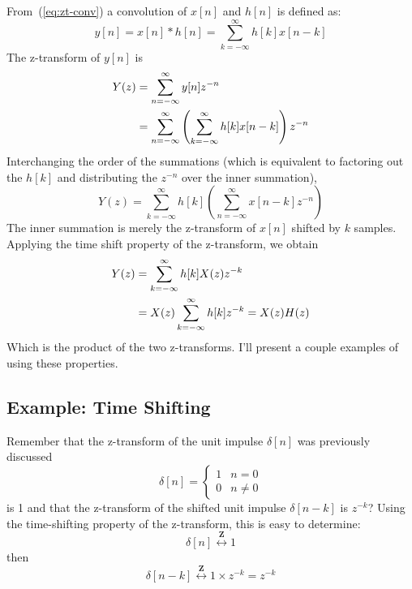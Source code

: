 From~(\ref{eq:zt-conv}) a convolution of $x[n]$ and $h[n]$ is defined as:
\begin{equation}
y[n] = x[n] \ast h[n] = \sum_{k=-\infty}^{\infty} h[k] x[n-k]
\end{equation}
The z-transform of $y[n]$ is 
\begin{align}
Y(z) &= \sum_{n=-\infty}^{\infty} y[n]z^{-n} \notag\\
     &= \sum_{n=-\infty}^{\infty}
     \left( \sum_{k=-\infty}^{\infty} h[k] x[n-k] \right)z^{-n}
\end{align}
Interchanging the order of the summations (which is equivalent to
factoring out the $h[k]$ and distributing the $z^{-n}$ over the inner
summation),
\begin{equation}
Y(z) = \sum_{k=-\infty}^{\infty} h[k]
             \left( \sum_{n=-\infty}^{\infty} x[n-k] z^{-n} \right)
\end{equation}
The inner summation is merely the z-transform of $x[n]$ shifted by $k$
samples.  Applying the time shift property of the z-transform, we
obtain
\begin{align}
Y(z) &= \sum_{k=-\infty}^{\infty} h[k] X(z) z^{-k} \notag\\
     &= X(z)\sum_{k=-\infty}^{\infty} h[k] z^{-k} 
     = X(z) H(z)
\end{align}
Which is the product of the two z-transforms. I'll present a couple
examples of using these properties.

\subsection{Example: Time Shifting}

Remember that the z-transform of the unit impulse
$\delta[n]$ was previously discussed
\begin{equation}
\delta[n] = \left\{\begin{array}{ll}
                        1 & n=0 \\
                        0 & n \neq 0
          \end{array}\right.
\end{equation}
is 1 and that the z-transform of the shifted unit impulse
$\delta[n-k]$ is $z^{-k}$? Using the time-shifting property of the
z-transform, this is easy to determine:
\begin{equation}
\delta[n]\stackrel{\mathbf{Z}}{\longleftrightarrow} 1
\end{equation}
then 
\begin{equation}
\delta[n-k]\stackrel{\mathbf{Z}}{\longleftrightarrow} 1 \times z^{-k}=z^{-k}
\end{equation}

